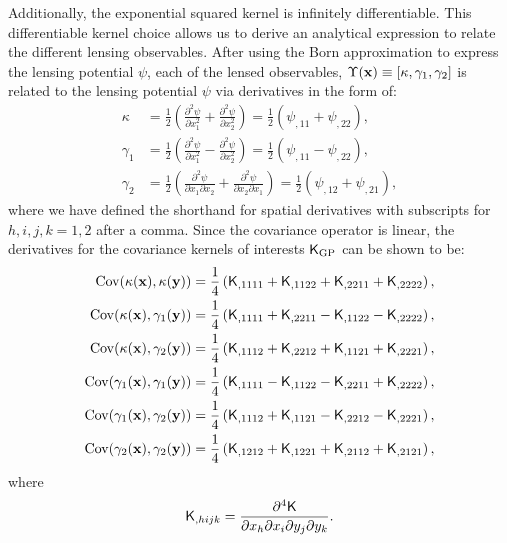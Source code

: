 Additionally, the exponential squared kernel is infinitely differentiable. This
differentiable kernel choice allows us to derive an analytical expression to
relate the different lensing observables.  
After using the Born approximation to express the lensing potential $\psi$,
each of the lensed observables, $\Upsilon(\mathbf{x}) \equiv [\kappa, \gamma_1,
\gamma_2]$ is related to the lensing potential $\psi$ via derivatives in the form of:
\begin{align}
\kappa &= \frac{1}{2}\left(\frac{\partial^2 \psi}{\partial x_1^2} +
\frac{\partial^2 \psi}{\partial x_2^2 }\right) 
= \frac{1}{2} (\psi_{,11} + \psi_{,22}),\\ 
\gamma_1 
&=\frac{1}{2}\left(\frac{\partial^2 \psi}{\partial x_1^2} - 
\frac{\partial^2 \psi}{\partial x_2^2}\right) 
= \frac{1}{2} (\psi_{,11} - \psi_{,22}), \\
\gamma_2 
&=\frac{1}{2}\left(\frac{\partial^2 \psi}{\partial x_1 \partial
x_2} + \frac{\partial^2 \psi}{\partial x_2 \partial x_1}\right)
= \frac{1}{2} (\psi_{,12} + \psi_{,21}), 
\end{align}
where we have defined the shorthand for spatial derivatives with
subscripts for $h,i,j,k = 1, 2$ after a comma.
Since the covariance operator is linear,
the derivatives for the covariance kernels of interests $\mathsf{K}_{\rm GP}$
can be shown to be:
\begin{align}
	\label{eq:kernel_derivatives1}
	\mathrm{Cov} (\kappa(\mathbf{x}), \kappa(\mathbf{y}))
&= \frac{1}{4}\left(
\mathsf{K}_{,1111} + \mathsf{K}_{,1122} + \mathsf{K}_{,2211} + \mathsf{K}_{,2222}
\right), \\
\mathrm{Cov}(\kappa(\mathbf{x}), \gamma_1(\mathbf{y})) &= \frac{1}{4}\left(
\mathsf{K}_{,1111} + \mathsf{K}_{,2211} - \mathsf{K}_{,1122} - \mathsf{K}_{,2222}
\right), \\
\mathrm{Cov}(\kappa(\mathbf{x}), \gamma_2(\mathbf{y})) &= \frac{1}{4}\left(
\mathsf{K}_{,1112} + \mathsf{K}_{,2212} + \mathsf{K}_{,1121} + \mathsf{K}_{,2221}
\right),\\
\mathrm{Cov}(\gamma_1(\mathbf{x}), \gamma_1(\mathbf{y})) &= \frac{1}{4}\left(
\mathsf{K}_{,1111} - \mathsf{K}_{,1122} - \mathsf{K}_{,2211} + \mathsf{K}_{,2222}
\right), \\
\mathrm{Cov}(\gamma_1(\mathbf{x}), \gamma_2(\mathbf{y})) &= \frac{1}{4}\left(
\mathsf{K}_{,1112} + \mathsf{K}_{,1121} - \mathsf{K}_{,2212} - \mathsf{K}_{,2221}
\right), \\
\mathrm{Cov}(\gamma_2(\mathbf{x}), \gamma_2(\mathbf{y})) &= \frac{1}{4}\left(
\mathsf{K}_{,1212} + \mathsf{K}_{,1221} + \mathsf{K}_{,2112} + \mathsf{K}_{,2121}
\right),
\end{align}
where
\begin{equation}
	\mathsf{K}_{,hijk} = \frac{\partial^4 \mathsf{K}}{\partial x_h \partial x_i
	\partial y_j \partial y_k}.
\end{equation}

